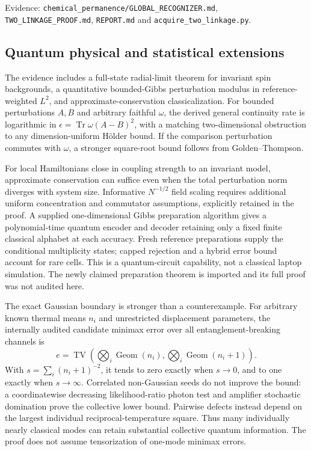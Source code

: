 \documentclass[11pt]{article}
\newcommand{\Tr}{\operatorname{Tr}}
\newcommand{\TV}{\operatorname{TV}}
\begin{document}
Evidence: \texttt{chemical\_permanence/GLOBAL\_RECOGNIZER.md}, \texttt{TWO\_LINKAGE\_PROOF.md}, \texttt{REPORT.md} and \texttt{acquire\_two\_linkage.py}.

\subsection{Quantum physical and statistical extensions}
The evidence includes a full-state radial-limit theorem for invariant spin backgrounds, a quantitative bounded-Gibbs perturbation modulus in reference-weighted $L^2$, and approximate-conservation classicalization. For bounded perturbations $A,B$ and arbitrary faithful $\omega$, the derived general continuity rate is logarithmic in $\epsilon=\Tr\omega(A-B)^2$, with a matching two-dimensional obstruction to any dimension-uniform H\"older bound. If the comparison perturbation commutes with $\omega$, a stronger square-root bound follows from Golden--Thompson.

For local Hamiltonians close in coupling strength to an invariant model, approximate conservation can suffice even when the total perturbation norm diverges with system size. Informative $N^{-1/2}$ field scaling requires additional uniform concentration and commutator assumptions, explicitly retained in the proof. A supplied one-dimensional Gibbs preparation algorithm gives a polynomial-time quantum encoder and decoder retaining only a fixed finite classical alphabet at each accuracy. Fresh reference preparations supply the conditional multiplicity states; capped rejection and a hybrid error bound account for rare cells. This is a quantum-circuit capability, not a classical laptop simulation. The newly claimed preparation theorem is imported and its full proof was not audited here.

The exact Gaussian boundary is stronger than a counterexample. For arbitrary known thermal means $n_i$ and unrestricted displacement parameters, the internally audited candidate minimax error over all entanglement-breaking channels is
\[
 e=\TV\!\left(\bigotimes_i\operatorname{Geom}(n_i),
                   \bigotimes_i\operatorname{Geom}(n_i+1)\right).
\]
With $s=\sum_i(n_i+1)^{-2}$, it tends to zero exactly when $s\to0$, and to one exactly when $s\to\infty$. Correlated non-Gaussian seeds do not improve the bound: a coordinatewise decreasing likelihood-ratio photon test and amplifier stochastic domination prove the collective lower bound. Pairwise defects instead depend on the largest individual reciprocal-temperature square. Thus many individually nearly classical modes can retain substantial collective quantum information. The proof does not assume tensorization of one-mode minimax errors.
\end{document}
